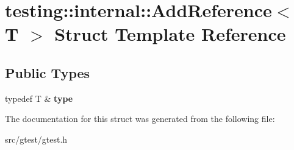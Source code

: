 \hypertarget{structtesting_1_1internal_1_1_add_reference}{}\section{testing\+:\+:internal\+:\+:Add\+Reference$<$ T $>$ Struct Template Reference}
\label{structtesting_1_1internal_1_1_add_reference}
\subsection*{Public Types}
\begin{DoxyCompactItemize}
\item 
\mbox{\label{structtesting_1_1internal_1_1_add_reference_a2df8dd7c4e41f6390e6e66b1a9a67bb4}} 
typedef T \& {\bfseries type}
\end{DoxyCompactItemize}


The documentation for this struct was generated from the following file\+:\begin{DoxyCompactItemize}
\item 
src/gtest/gtest.\+h\end{DoxyCompactItemize}
